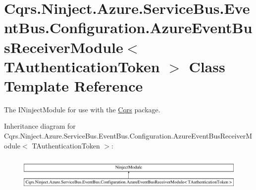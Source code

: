\hypertarget{classCqrs_1_1Ninject_1_1Azure_1_1ServiceBus_1_1EventBus_1_1Configuration_1_1AzureEventBusReceiverModule}{}\section{Cqrs.\+Ninject.\+Azure.\+Service\+Bus.\+Event\+Bus.\+Configuration.\+Azure\+Event\+Bus\+Receiver\+Module$<$ T\+Authentication\+Token $>$ Class Template Reference}
\label{classCqrs_1_1Ninject_1_1Azure_1_1ServiceBus_1_1EventBus_1_1Configuration_1_1AzureEventBusReceiverModule}


The I\+Ninject\+Module for use with the \hyperlink{namespaceCqrs}{Cqrs} package.  


Inheritance diagram for Cqrs.\+Ninject.\+Azure.\+Service\+Bus.\+Event\+Bus.\+Configuration.\+Azure\+Event\+Bus\+Receiver\+Module$<$ T\+Authentication\+Token $>$\+:\begin{figure}[H]
\begin{center}
\leavevmode
\includegraphics[height=1.691843cm]{classCqrs_1_1Ninject_1_1Azure_1_1ServiceBus_1_1EventBus_1_1Configuration_1_1AzureEventBusReceiverModule}
\end{center}
\end{figure}

